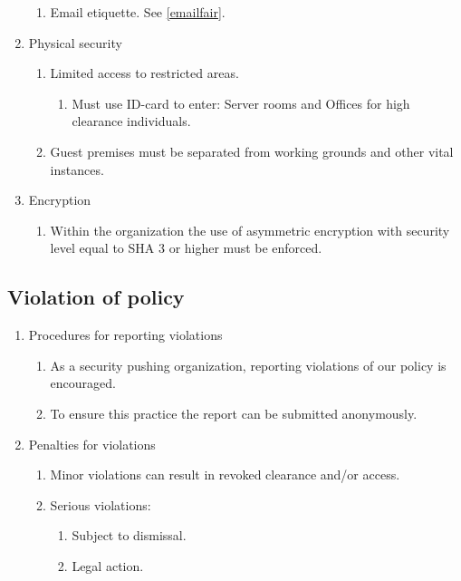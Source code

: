 \begin{enumerate}
\begin{enumerate}
    \item Email etiquette. See \ref{emailfair}.
  \end{enumerate}
  \item Physical security
  \begin{enumerate}
    \item Limited access to restricted areas.
    \begin{enumerate}
      \item Must use ID-card to enter: Server rooms and Offices for high clearance individuals.
    \end{enumerate}
    \item Guest premises must be separated from working grounds and other vital instances.
  \end{enumerate}
  \item Encryption
  \begin{enumerate}
    \item Within the organization the use of asymmetric encryption with security level equal to SHA 3 or higher must be enforced.
  \end{enumerate}
\end{enumerate}

\subsection{Violation of policy}

\begin{enumerate}
  \item Procedures for reporting violations
  \begin{enumerate}
    \item As a security pushing organization, reporting violations of our policy is encouraged.
    \item To ensure this practice the report can be submitted anonymously.
  \end{enumerate}
    \item Penalties for violations
  \begin{enumerate}
    \item Minor violations can result in revoked clearance and/or access.
    \item Serious violations:
    \begin{enumerate}
      \item Subject to dismissal.
      \item Legal action.
    \end{enumerate}
  \end{enumerate}
\end{enumerate}

